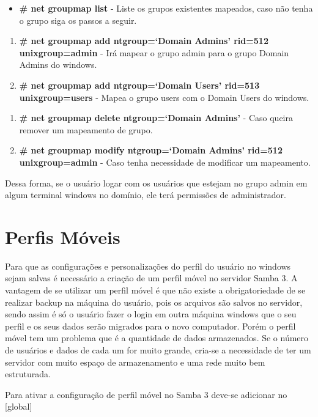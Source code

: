 \clearpage

\begin{itemize}
	\item \textbf{\# net groupmap list} - Liste os grupos existentes mapeados, caso não tenha o grupo siga os passos a seguir.
\end{itemize}
\begin{enumerate}
	\item \textbf{\# net groupmap add ntgroup=`Domain Admins' rid=512 unixgroup=admin} - Irá mapear o grupo admin para o grupo Domain Admins do windows.
	\item \textbf{\# net groupmap add ntgroup=`Domain Users' rid=513 unixgroup=users} - Mapea o grupo users com o Domain Users do windows.
\end{enumerate}

\begin{enumerate}
	\item \textbf{\# net groupmap delete ntgroup=`Domain Admins'} - Caso queira remover um mapeamento de grupo.
	\item \textbf{\# net groupmap modify ntgroup=`Domain Admins' rid=512 unixgroup=admin} - Caso tenha necessidade de modificar um mapeamento.
\end{enumerate}

Dessa forma, se o usuário logar com os usuários que estejam no grupo admin em algum terminal windows no domínio, ele terá permissões de administrador.

\section{Perfis Móveis}

Para que as configurações e personalizações do perfil do usuário no windows sejam salvas é necessário a criação de um perfil móvel no servidor Samba 3. 
A vantagem de se utilizar um perfil móvel é que não existe a obrigatoriedade de se realizar backup na máquina do usuário, pois os arquivos são salvos no servidor, sendo assim é só o usuário fazer o login em outra máquina windows que o seu perfil e os seus dados serão migrados para o novo computador. Porém o perfil móvel tem um problema que é a quantidade de dados armazenados. Se o número de usuários e dados de cada um for muito grande, cria-se a necessidade de ter um servidor com muito espaço de armazenamento e uma rede muito bem estruturada. 

Para ativar a configuração de perfil móvel no Samba 3 deve-se adicionar no [global]\\

